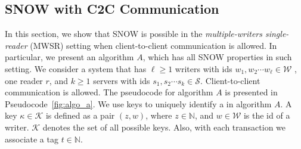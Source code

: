 \subsection{SNOW with C2C Communication}
\label{app:algorithm-a}
In this section,  we show that SNOW is possible in the   \emph{multiple-writers single-reader} 
(MWSR) setting %
when client-to-client communication is allowed. In particular, we present an algorithm $A$, which has all SNOW properties in such setting.
We consider a system that has $\ell \geq 1$ writers with ids $w_1, 
w_2 \cdots w_{\ell} \in \mathcal{W}$ 
, one reader $r$, and  $k \geq 1$ servers with ids $s_1, s_2\cdots s_k \in \mathcal{S}$. 
Client-to-client communication is allowed. 
%			
%
The pseudocode for algorithm $A$ is presented in Pseudocode~\ref{fig:algo_a}. 
%
We use keys to uniquely identify a \wot{} in algorithm $A$.  A key $\kappa \in \mathcal{K}$ is defined as a pair $(z, w)$, 
where $z \in \mathbb{N}$, and $w \in \mathcal{W}$ is the id of a writer. $\mathcal{K}$ denotes the set of all possible keys. 
Also, with each transaction we associate a tag $t \in \mathbb{N}$. %


